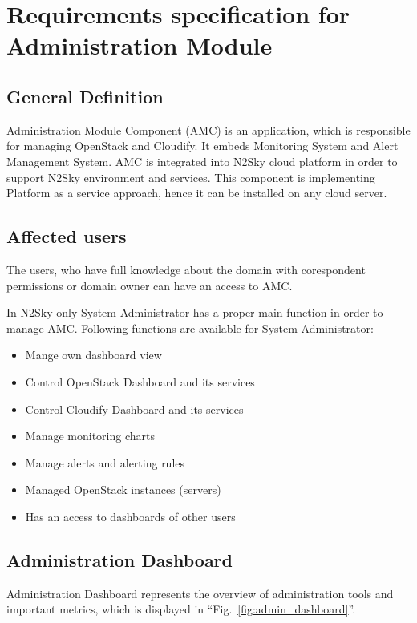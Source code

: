 \section{Requirements specification for Administration Module}\label{Administration components}

\subsection{General Definition}\label{General Definition AMC}

Administration Module Component (AMC) is an application, which is responsible for managing OpenStack and Cloudify. It embeds Monitoring System and Alert Management System. AMC is integrated into N2Sky cloud platform in order to support N2Sky environment and services. This component is implementing Platform as a service approach, hence it can be installed on any cloud server. 

\subsection{Affected users}\label{Affected users}

The users, who have full knowledge about the domain with corespondent permissions or domain owner can have an access to AMC.

In N2Sky only System Administrator has a proper main function in order to manage AMC.
Following functions are available for System Administrator:
\begin{itemize}
\item Mange own dashboard view
\item Control OpenStack Dashboard and its services
\item Control Cloudify Dashboard and its services
\item Manage monitoring charts
\item Manage alerts and alerting rules
\item Managed OpenStack instances (servers)
\item Has an access to dashboards of other users
\end{itemize}



\subsection{Administration Dashboard}\label{Administration Dashboard}

Administration Dashboard represents the overview of administration tools and important metrics, which is displayed in ``Fig.~\ref{fig:admin_dashboard}''. 

